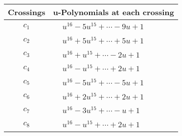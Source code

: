 \documentclass[1p]{elsarticle_modified}
\theoremstyle{definition}
\begin{document}
\begin{tabular}{m{50pt}|m{274pt}}
Crossings & \hspace{64pt}u-Polynomials at each crossing \\
\hline $$\begin{aligned}c_{1}\end{aligned}$$&$\begin{aligned}
&u^{16}-5 u^{15}+\cdots-9 u+1
\end{aligned}$\\
\hline $$\begin{aligned}c_{2}\end{aligned}$$&$\begin{aligned}
&u^{16}+5 u^{15}+\cdots+5 u+1
\end{aligned}$\\
\hline $$\begin{aligned}c_{3}\end{aligned}$$&$\begin{aligned}
&u^{16}+u^{15}+\cdots-2 u+1
\end{aligned}$\\
\hline $$\begin{aligned}c_{4}\end{aligned}$$&$\begin{aligned}
&u^{16}- u^{15}+\cdots+2 u+1
\end{aligned}$\\
\hline $$\begin{aligned}c_{5}\end{aligned}$$&$\begin{aligned}
&u^{16}-5 u^{15}+\cdots-5 u+1
\end{aligned}$\\
\hline $$\begin{aligned}c_{6}\end{aligned}$$&$\begin{aligned}
&u^{16}+2 u^{15}+\cdots+2 u+1
\end{aligned}$\\
\hline $$\begin{aligned}c_{7}\end{aligned}$$&$\begin{aligned}
&u^{16}-3 u^{15}+\cdots- u+1
\end{aligned}$\\
\hline $$\begin{aligned}c_{8}\end{aligned}$$&$\begin{aligned}
&u^{16}- u^{15}+\cdots+2 u+1
\end{aligned}$\\

\end{tabular}
\end{document}
